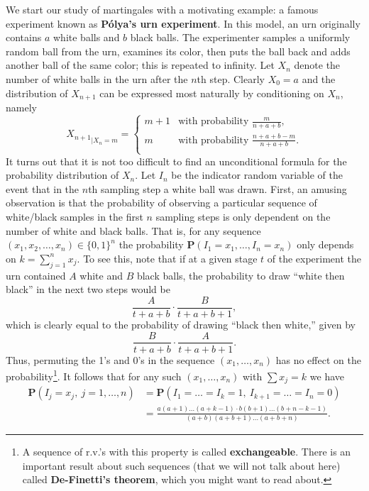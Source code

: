 \documentclass[12pt]{article}
\newcommand{\prob}{\mathbf{P}}
\theoremstyle{example}
\begin{document}
We start our study of martingales with a motivating example: a famous experiment known as \textbf{P\'olya's urn experiment}. In this model, an urn originally contains $a$ white balls and $b$ black balls. The experimenter samples a uniformly random ball from the urn, examines its color, then puts the ball back and adds another ball of the same color; this is repeated to infinity. Let $X_n$ denote the number of white balls in the urn after the $n$th step. Clearly $X_0 = a$ and the distribution of $X_{n+1}$ can be expressed most naturally by conditioning on $X_n$, namely
\begin{equation}\label{eq:polya-conditional}
{X_{n+1}}_{\big| X_n = m} = 
\begin{cases} 
m+1 & \textrm{with probability }\frac{m}{n+a+b}, \\
m & \textrm{with probability }\frac{n+a+b-m}{n+a+b}. \\
\end{cases}
\end{equation}
It turns out that it is not too difficult to find an unconditional formula for the probability distribution of $X_n$. Let $I_n$ be the indicator random variable of the event that in the $n$th sampling step a white ball was drawn. First, an amusing observation is that the probability of observing a particular sequence of white/black samples in the first $n$ sampling steps is only dependent on the number of white and black balls. That is, for any sequence $(x_1,x_2,\ldots,x_n)\in \{0,1\}^n$
the probability $\prob(I_1 = x_1, \ldots, I_n = x_n)$ only depends on $k=\sum_{j=1}^n x_j$. To see this, note that if at a given stage $t$ of the experiment the urn contained $A$ white and $B$ black balls, the probability to draw ``white then black'' in the next two steps would be
$$ \frac{A}{t+a+b}\cdot \frac{B}{t+a+b+1}, $$
which is clearly equal to the probability of drawing ``black then white,'' given by
$$ \frac{B}{t+a+b}\cdot \frac{A}{t+a+b+1}. $$
Thus, permuting the 1's and 0's in the sequence $(x_1,\ldots,x_n)$ has no effect on the probability\footnote{A sequence of r.v.'s with this property is called \textbf{exchangeable}. There is an important result about such sequences (that we will not talk about here) called \textbf{De-Finetti's theorem}, which you might want to read about.}. It follows that for any such $(x_1,\ldots,x_n)$ with $\sum x_j=k$ we have
\begin{align}
\prob(I_j = x_j,\ j=1,\ldots,n) &= \prob(I_1=\ldots=I_k=1,\ I_{k+1}=\ldots=I_n=0)
\nonumber \\ &= \frac{a(a+1)\ldots(a+k-1)\cdot b(b+1)\ldots(b+n-k-1)}{(a+b)(a+b+1)\ldots(a+b+n)}.
\label{eq:polyaurn-formula}
\end{align}
\end{document}
